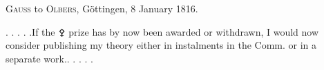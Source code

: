 \par{}\bigskip
\begin{center}
\textsc{Gauss} to \textsc{Olbers}, Göttingen, 8 January 1816.
\end{center}
\noindent\hspace*{\parindent}. . . . .\quad If the {\AstroSymbols ⚴} prize has by now been awarded or withdrawn, I would now consider publishing my theory either in instalments in the Comm. or in a separate work.\quad . . . . .
\par
